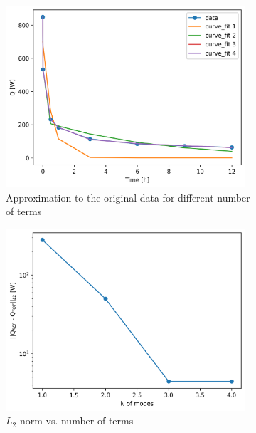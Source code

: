 \begin{figure}[htbp!] %
  \centering
  \begin{subfigure}[b]{0.48\textwidth}
    \centering
    \includegraphics[width=0.98\textwidth]{figures/atr-13-ft}
    \caption{Approximation to the original data for different number of terms}
    \label{fig:modes-atr-a}
  \end{subfigure}
  \hfill
  \begin{subfigure}[b]{0.48\textwidth}
    \centering
    \includegraphics[width=0.98\textwidth]{figures/atr-13-er}
    \caption{$L_2$-norm vs. number of terms}
    \label{fig:modes-atr-b}
  \end{subfigure}
  \hfill
  \begin{subfigure}[b]{0.48\textwidth}

\end{subfigure}
\end{figure}
